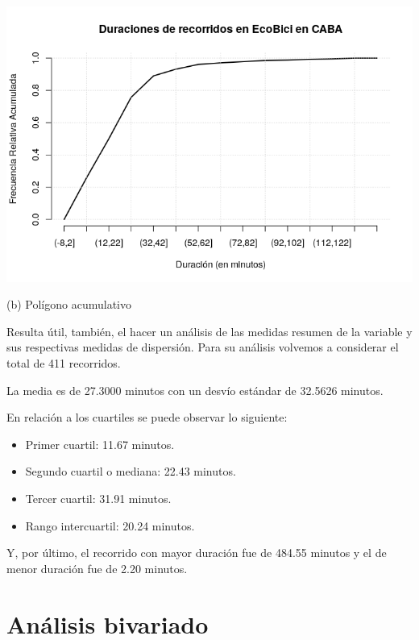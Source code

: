 \documentclass[11pt]{article}
\begin{document}
        \begin{center}
          \includegraphics[scale=0.55]{PoligAcumDuracion.png}
          \vspace{-4mm}
      
          (b) Pol\'igono acumulativo
        \end{center}

        Resulta \'util, tambi\'en, el hacer un an\'alisis de las medidas resumen de la variable y sus respectivas medidas de dispersi\'on.
        Para su an\'alisis volvemos a considerar el total de 411 recorridos.

        La media es de 27.3000 minutos con un desv\'io est\'andar de 32.5626 minutos. 

        En relaci\'on a los cuartiles se puede observar lo siguiente:

        \begin{itemize}
          \item Primer cuartil: 11.67 minutos.
          \item Segundo cuartil o mediana: 22.43 minutos.
          \item Tercer cuartil: 31.91 minutos.
          \item Rango intercuartil: 20.24 minutos.
        \end{itemize}

        Y, por \'ultimo, el recorrido con mayor duraci\'on fue de 484.55 minutos y el de menor duraci\'on fue de 2.20 minutos.

        \section{An\'alisis bivariado}
\end{document}
